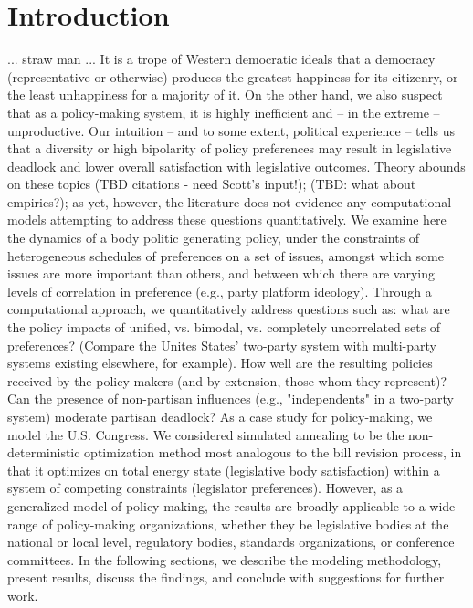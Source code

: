 \documentclass[pdftex,12pt]{llncs}
\begin{document}
\section{Introduction}
... straw man ...
It is a trope of Western democratic ideals that a democracy (representative or otherwise) produces the greatest happiness for its citizenry, or the least unhappiness for a majority of it.
On the other hand, we also suspect that as a policy-making system, it is highly inefficient and -- in the extreme -- unproductive.
Our intuition -- and to some extent, political experience -- tells us that a diversity or high bipolarity of policy preferences may result in legislative deadlock and lower overall satisfaction with legislative outcomes.
Theory abounds on these topics (TBD citations - need Scott's input!); (TBD: what about empirics?); as yet, however, the literature does not evidence any computational models attempting to address these questions quantitatively.
We examine here the dynamics of a body politic generating policy, under the constraints of heterogeneous schedules of preferences on a set of issues, amongst which some issues are more important than others, and between which there are varying levels of correlation in preference (e.g., party platform ideology).
Through a computational approach, we quantitatively address questions such as: what are the policy impacts of unified, vs. bimodal, vs. completely uncorrelated sets of preferences?
(Compare the Unites States' two-party system with multi-party systems existing elsewhere, for example).
How well are the resulting policies received by the policy makers (and by extension, those whom they represent)?
Can the presence of non-partisan influences (e.g., "independents" in a two-party system) moderate partisan deadlock?
As a case study for policy-making, we model the U.S. Congress.
We considered simulated annealing to be the non-deterministic optimization method most analogous to the bill revision process, in that it optimizes on total energy state (legislative body satisfaction) within a system of competing constraints (legislator preferences).
However, as a generalized model of policy-making, the results are broadly applicable to a wide range of policy-making organizations, whether they be legislative bodies at the national or local level, regulatory bodies, standards organizations, or conference committees.
In the following sections, we describe the modeling methodology, present results, discuss the findings, and conclude with suggestions for further work.
\end{document}
